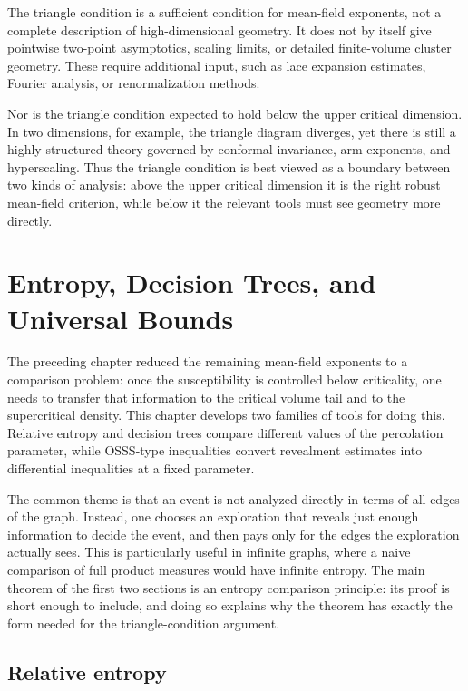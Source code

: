 \documentclass[11pt,reqno]{book}
\numberwithin{equation}{chapter}
\theoremstyle{plain}
\theoremstyle{definition}
\theoremstyle{remark}
\newcommand{\1}{\mathbf 1}
\begin{document}
The triangle condition is a sufficient condition for mean-field exponents, not a complete description of high-dimensional geometry. It does not by itself give pointwise two-point asymptotics, scaling limits, or detailed finite-volume cluster geometry. These require additional input, such as lace expansion estimates, Fourier analysis, or renormalization methods.

Nor is the triangle condition expected to hold below the upper critical dimension. In two dimensions, for example, the triangle diagram diverges, yet there is still a highly structured theory governed by conformal invariance, arm exponents, and hyperscaling. Thus the triangle condition is best viewed as a boundary between two kinds of analysis: above the upper critical dimension it is the right robust mean-field criterion, while below it the relevant tools must see geometry more directly.

\chapter{Entropy, Decision Trees, and Universal Bounds}

The preceding chapter reduced the remaining mean-field exponents to a comparison problem: once the susceptibility is controlled below criticality, one needs to transfer that information to the critical volume tail and to the supercritical density. This chapter develops two families of tools for doing this. Relative entropy and decision trees compare different values of the percolation parameter, while OSSS-type inequalities convert revealment estimates into differential inequalities at a fixed parameter.

The common theme is that an event is not analyzed directly in terms of all edges of the graph. Instead, one chooses an exploration that reveals just enough information to decide the event, and then pays only for the edges the exploration actually sees. This is particularly useful in infinite graphs, where a naive comparison of full product measures would have infinite entropy. The main theorem of the first two sections is an entropy comparison principle: its proof is short enough to include, and doing so explains why the theorem has exactly the form needed for the triangle-condition argument.

\section{Relative entropy}
\end{document}

